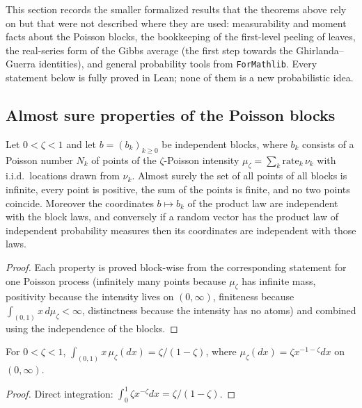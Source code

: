 This section records the smaller formalized results that the theorems above rely on but that were not described
where they are used: measurability and moment facts about the Poisson blocks, the bookkeeping of the first-level
peeling of leaves, the real-series form of the Gibbs average (the first step towards the Ghirlanda--Guerra
identities), and general probability tools from \texttt{ForMathlib}.
Every statement below is fully proved in Lean; none of them is a new probabilistic idea.

\subsection*{Almost sure properties of the Poisson blocks}

\begin{lemma}\label{lem:sg:blocks-good}
  \leanok
Let $0<\zeta<1$ and let $b=(b_k)_{k\ge0}$ be independent blocks, where $b_k$ consists of a Poisson number $N_k$ of points of the $\zeta$-Poisson
intensity $\mu_\zeta=\sum_k\mathrm{rate}_k\,\nu_k$ with i.i.d.\ locations drawn from $\nu_k$. Almost surely the set of all points of all blocks is infinite, every
point is positive, the sum of the points is finite, and no two points coincide.
Moreover the coordinates $b\mapsto b_k$ of the product law are independent with the block laws, and conversely if a random vector has the
product law of independent probability measures then its coordinates are independent with those laws.
\end{lemma}
\begin{proof}
  \leanok
Each property is proved block-wise from the corresponding statement for one Poisson process (infinitely many points because $\mu_\zeta$ has infinite mass,
positivity because the intensity lives on $(0,\infty)$, finiteness because $\int_{(0,1)}x\,d\mu_\zeta<\infty$, distinctness because the intensity has no atoms) and
combined using the independence of the blocks.
\end{proof}

\begin{lemma}\label{lem:sg:small-mass}
  \leanok
For $0<\zeta<1$, $\int_{(0,1)}x\,\mu_\zeta(dx)=\zeta/(1-\zeta)$, where $\mu_\zeta(dx)=\zeta x^{-1-\zeta}dx$ on $(0,\infty)$.
\end{lemma}
\begin{proof}
  \leanok
Direct integration: $\int_0^1\zeta x^{-\zeta}dx=\zeta/(1-\zeta)$.
\end{proof}

